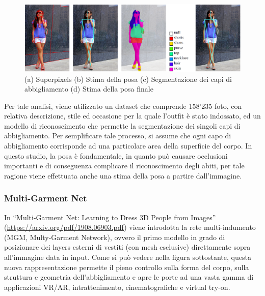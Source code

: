 \begin{figure}[ht!]
  \centering
  \includegraphics[scale=0.4]{Images/IntroductionPic/parsingclothing.png}
  \caption{(a) Superpixels (b) Stima della posa (c) Segmentazione dei capi di abbigliamento (d) Stima della posa finale }
  \label{fig:SMPL2}
\end{figure}
Per tale analisi, viene utilizzato un dataset che comprende 158’235 foto, con relativa descrizione, stile ed occasione per la quale l’outfit è stato indossato, ed un modello di riconoscimento che permette la segmentazione dei singoli capi di abbigliamento. Per semplificare tale processo, si assume che ogni capo di abbigliamento corrisponde ad una particolare area della superficie del corpo. In questo studio, la posa è fondamentale, in quanto può causare occlusioni importanti e di conseguenza complicare il riconoscimento degli abiti, per tale ragione viene effettuata anche una stima della posa a partire dall’immagine.

\medskip

\subsubsection{Multi-Garment Net}

In “Multi-Garment Net: Learning to Dress 3D People from Images” (\url{https://arxiv.org/pdf/1908.06903.pdf}) viene introdotta la rete multi-indumento (MGM, Multy-Garment Network), ovvero il primo modello in grado di posizionare dei layers esterni di vestiti (con mesh esclusive) direttamente sopra all’immagine data in input.
Come si può vedere nella figura sottostante, questa nuova rappresentazione permette il pieno controllo sulla forma del corpo, sulla struttura e geometria dell’abbigliamento e apre le porte ad una vasta gamma di applicazioni VR/AR, intrattenimento, cinematografiche e virtual try-on.

